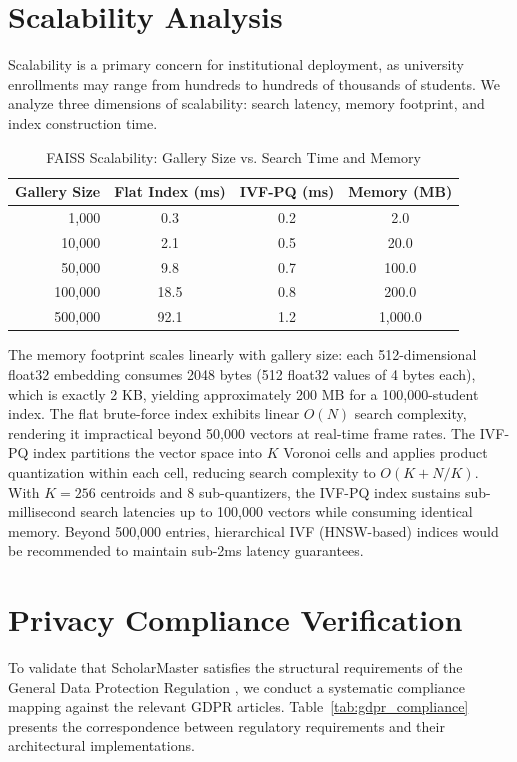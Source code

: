 \documentclass[12pt,a4paper,oneside]{report}
\begin{document}
\section{Scalability Analysis}
Scalability is a primary concern for institutional deployment, as university enrollments may range from hundreds to hundreds of thousands of students. We analyze three dimensions of scalability: search latency, memory footprint, and index construction time.

\begin{table}[htbp]
\caption{FAISS Scalability: Gallery Size vs. Search Time and Memory}
\centering
\small
{}
\setlength{\tabcolsep}{4pt}
\begin{tabular}{@{}r c c c@{}}
\hline
\textbf{Gallery Size} & \textbf{Flat Index (ms)} & \textbf{IVF-PQ (ms)} & \textbf{Memory (MB)} \\ \hline
1,000 & 0.3 & 0.2 & 2.0 \\
10,000 & 2.1 & 0.5 & 20.0 \\
50,000 & 9.8 & 0.7 & 100.0 \\
100,000 & 18.5 & 0.8 & 200.0 \\
500,000 & 92.1 & 1.2 & 1,000.0 \\ \hline
\end{tabular}
\label{tab:scalability_analysis}
\end{table}

The memory footprint scales linearly with gallery size: each 512-dimensional float32 embedding consumes 2048 bytes (512 float32 values of 4 bytes each), which is exactly 2 KB, yielding approximately 200 MB for a 100,000-student index. The flat brute-force index exhibits linear $O(N)$ search complexity, rendering it impractical beyond 50,000 vectors at real-time frame rates. The IVF-PQ index partitions the vector space into $K$ Voronoi cells and applies product quantization within each cell, reducing search complexity to $O(K + N/K)$. With $K = 256$ centroids and 8 sub-quantizers, the IVF-PQ index sustains sub-millisecond search latencies up to 100,000 vectors while consuming identical memory. Beyond 500,000 entries, hierarchical IVF (HNSW-based) indices would be recommended to maintain sub-2ms latency guarantees.

\section{Privacy Compliance Verification}
To validate that ScholarMaster satisfies the structural requirements of the General Data Protection Regulation \cite{gdpr2016}, we conduct a systematic compliance mapping against the relevant GDPR articles. Table~\ref{tab:gdpr_compliance} presents the correspondence between regulatory requirements and their architectural implementations.
\end{document}
